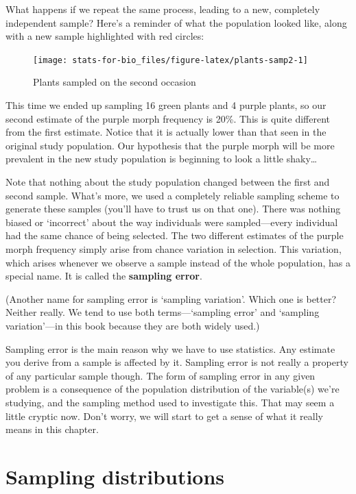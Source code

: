 \documentclass[]{book}
\begin{document}
What happens if we repeat the same process, leading to a new, completely
independent sample? Here's a reminder of what the population looked
like, along with a new sample highlighted with red circles:

\begin{figure}

{\centering \texttt{[image: stats-for-bio\_files/figure-latex/plants-samp2-1]} 

}

\caption{Plants sampled on the second occasion}\label{fig:plants-samp2}
\end{figure}

This time we ended up sampling 16 green plants and 4 purple plants, so
our second estimate of the purple morph frequency is 20\%. This is quite
different from the first estimate. Notice that it is actually lower than
that seen in the original study population. Our hypothesis that the
purple morph will be more prevalent in the new study population is
beginning to look a little shaky\ldots{}

Note that nothing about the study population changed between the first
and second sample. What's more, we used a completely reliable sampling
scheme to generate these samples (you'll have to trust us on that one).
There was nothing biased or `incorrect' about the way individuals were
sampled---every individual had the same chance of being selected. The
two different estimates of the purple morph frequency simply arise from
chance variation in selection. This variation, which arises whenever we
observe a sample instead of the whole population, has a special name. It
is called the \textbf{sampling error}.

(Another name for sampling error is `sampling variation'. Which one is
better? Neither really. We tend to use both terms---`sampling error' and
`sampling variation'---in this book because they are both widely used.)

Sampling error is the main reason why we have to use statistics. Any
estimate you derive from a sample is affected by it. Sampling error is
not really a property of any particular sample though. The form of
sampling error in any given problem is a consequence of the population
distribution of the variable(s) we're studying, and the sampling method
used to investigate this. That may seem a little cryptic now. Don't
worry, we will start to get a sense of what it really means in this
chapter.

\section{Sampling distributions}\label{sampling-distributions}
\end{document}
